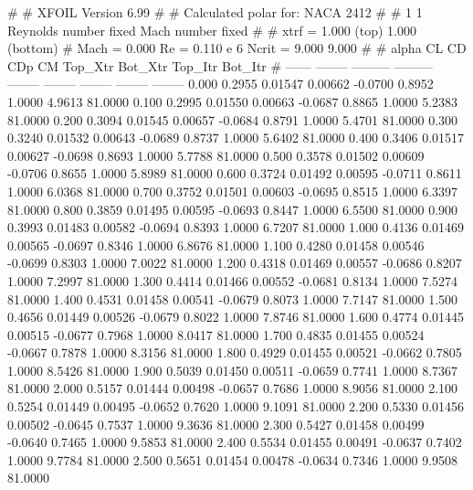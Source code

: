 #  
#       XFOIL         Version 6.99
#  
# Calculated polar for: NACA 2412                                       
#  
# 1 1 Reynolds number fixed          Mach number fixed         
#  
# xtrf =   1.000 (top)        1.000 (bottom)  
# Mach =   0.000     Re =     0.110 e 6     Ncrit =   9.000  9.000
#  
#   alpha    CL        CD       CDp       CM     Top_Xtr  Bot_Xtr  Top_Itr  Bot_Itr
#  ------ -------- --------- --------- -------- -------- -------- -------- --------
   0.000   0.2955   0.01547   0.00662  -0.0700   0.8952   1.0000   4.9613  81.0000
   0.100   0.2995   0.01550   0.00663  -0.0687   0.8865   1.0000   5.2383  81.0000
   0.200   0.3094   0.01545   0.00657  -0.0684   0.8791   1.0000   5.4701  81.0000
   0.300   0.3240   0.01532   0.00643  -0.0689   0.8737   1.0000   5.6402  81.0000
   0.400   0.3406   0.01517   0.00627  -0.0698   0.8693   1.0000   5.7788  81.0000
   0.500   0.3578   0.01502   0.00609  -0.0706   0.8655   1.0000   5.8989  81.0000
   0.600   0.3724   0.01492   0.00595  -0.0711   0.8611   1.0000   6.0368  81.0000
   0.700   0.3752   0.01501   0.00603  -0.0695   0.8515   1.0000   6.3397  81.0000
   0.800   0.3859   0.01495   0.00595  -0.0693   0.8447   1.0000   6.5500  81.0000
   0.900   0.3993   0.01483   0.00582  -0.0694   0.8393   1.0000   6.7207  81.0000
   1.000   0.4136   0.01469   0.00565  -0.0697   0.8346   1.0000   6.8676  81.0000
   1.100   0.4280   0.01458   0.00546  -0.0699   0.8303   1.0000   7.0022  81.0000
   1.200   0.4318   0.01469   0.00557  -0.0686   0.8207   1.0000   7.2997  81.0000
   1.300   0.4414   0.01466   0.00552  -0.0681   0.8134   1.0000   7.5274  81.0000
   1.400   0.4531   0.01458   0.00541  -0.0679   0.8073   1.0000   7.7147  81.0000
   1.500   0.4656   0.01449   0.00526  -0.0679   0.8022   1.0000   7.8746  81.0000
   1.600   0.4774   0.01445   0.00515  -0.0677   0.7968   1.0000   8.0417  81.0000
   1.700   0.4835   0.01455   0.00524  -0.0667   0.7878   1.0000   8.3156  81.0000
   1.800   0.4929   0.01455   0.00521  -0.0662   0.7805   1.0000   8.5426  81.0000
   1.900   0.5039   0.01450   0.00511  -0.0659   0.7741   1.0000   8.7367  81.0000
   2.000   0.5157   0.01444   0.00498  -0.0657   0.7686   1.0000   8.9056  81.0000
   2.100   0.5254   0.01449   0.00495  -0.0652   0.7620   1.0000   9.1091  81.0000
   2.200   0.5330   0.01456   0.00502  -0.0645   0.7537   1.0000   9.3636  81.0000
   2.300   0.5427   0.01458   0.00499  -0.0640   0.7465   1.0000   9.5853  81.0000
   2.400   0.5534   0.01455   0.00491  -0.0637   0.7402   1.0000   9.7784  81.0000
   2.500   0.5651   0.01454   0.00478  -0.0634   0.7346   1.0000   9.9508  81.0000
